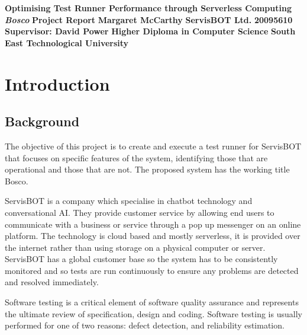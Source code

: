 \documentclass[12pt,a4paper,titlepage]{report}
\newcommand\AcademicTitle{Optimising Test Runner Performance through Serverless Computing}
\newcommand\CommercialTitle{Bosco}
\newcommand\Author{Margaret McCarthy}
\newcommand\StudentID{20095610}
\newcommand\Report{Project Report}
\newcommand\Stakeholder{ServisBOT Ltd.}
\newcommand\Course{Higher Diploma in Computer Science}
\newcommand\Reader{Supervisor: David Power}
\newcommand\University{South East Technological University}
\begin{document}

\thispagestyle{empty}
\begin{center}
 \mbox{}\vfill
 {\fontsize{17pt}{20pt}\selectfont \bfseries \AcademicTitle}
 \vfill
 {\fontsize{14pt}{20pt}\selectfont \bfseries\itshape \CommercialTitle}
 \vfill
 {\fontsize{12pt}{20pt}\selectfont \bfseries \Report}
 \vfill
 {\fontsize{14pt}{20pt}\selectfont \bfseries \Author}
 \vfill
 {\fontsize{14pt}{20pt}\selectfont \bfseries \Stakeholder}
 \vfill
 {\fontsize{14pt}{20pt}\selectfont \bfseries \StudentID}
 \vfill
 {\fontsize{14pt}{20pt}\selectfont \bfseries \Reader}
 \vfill
 {\fontsize{14pt}{20pt}\selectfont \bfseries \Course}
 \vfill
 {\fontsize{14pt}{20pt}\selectfont \bfseries \University}
 \vfill
\end{center}
\clearpage

\tableofcontents

\listoftables

\listoffigures

\clearpage
{}
\setcounter{page}{1}

\chapter{Introduction}

\section{Background}

The objective of this project is to create and execute a test runner for ServisBOT that focuses on specific features of the system, identifying those that are operational and those that are not. The proposed system has the working title Bosco.

ServisBOT is a company which specialise in chatbot technology and conversational AI. They provide customer service by allowing end users to communicate with a business or service through a pop up messenger on an online platform. 
The technology is cloud based and mostly serverless, it is provided over the internet rather than using storage on a physical computer or server. ServisBOT has a global customer base so the system has to be consistently monitored and so tests are run continuously to ensure any problems are detected and resolved immediately. 

Software testing is a critical element of software quality assurance and represents the ultimate review of specification, design and coding. Software testing is usually performed for one of two reasons: defect detection, and reliability estimation. \cite{Ahamed}
\end{document}
